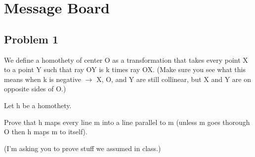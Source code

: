 \section{Message Board}

\subsection{Problem 1}

We define a homothety of center O as a transformation that takes every point X to a point Y such that ray OY is k times ray OX. (Make sure you see what this means when k is negative $\rightarrow$ X, O, and Y are still collinear, but X and Y are on opposite sides of O.)

Let h be a homothety.

Prove that h maps every line m into a line parallel to m (unless m goes thorough O then h maps m to itself).

(I'm asking you to prove stuff we assumed in class.)

